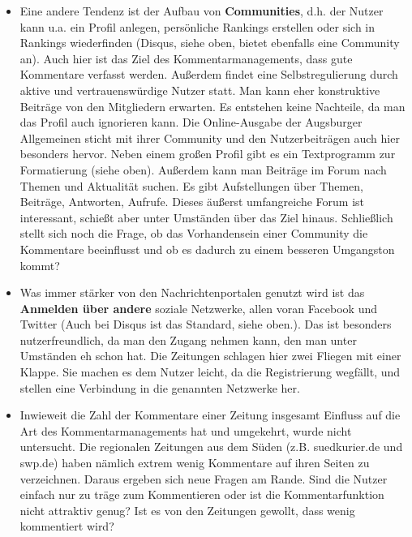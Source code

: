 \begin{itemize}
\item Eine andere Tendenz ist der Aufbau von {\bfseries Communities}, d.h. der Nutzer kann u.a. ein Profil anlegen, persönliche Rankings erstellen oder sich in Rankings wiederfinden (Disqus, siehe oben,  bietet ebenfalls eine Community an). Auch hier ist das Ziel des Kommentarmanagements, dass gute Kommentare verfasst werden. Außerdem findet eine Selbstregulierung durch aktive und vertrauenswürdige Nutzer statt. Man kann eher konstruktive Beiträge von den Mitgliedern erwarten. Es entstehen keine Nachteile, da man das Profil auch ignorieren kann.
Die Online-Ausgabe der Augsburger Allgemeinen sticht mit ihrer Community und den Nutzerbeiträgen auch hier besonders hervor. Neben einem großen Profil gibt es ein Textprogramm zur Formatierung (siehe oben). Außerdem kann man Beiträge im Forum nach Themen und Aktualität suchen. Es gibt Aufstellungen über Themen, Beiträge, Antworten, Aufrufe. Dieses äußerst umfangreiche Forum ist interessant, schießt aber unter Umständen über das Ziel hinaus. 
Schließlich stellt sich noch die Frage, ob das Vorhandensein einer Community die Kommentare beeinflusst und ob es dadurch zu einem besseren Umgangston kommt?\\

\item Was immer stärker von den Nachrichtenportalen genutzt wird ist das
{\bfseries Anmelden über andere} soziale Netzwerke, allen voran Facebook und Twitter (Auch bei Disqus ist das Standard, siehe oben.). Das ist besonders nutzerfreundlich, da man den Zugang nehmen kann, den man unter Umständen eh schon hat. Die Zeitungen schlagen hier zwei Fliegen mit einer Klappe. Sie machen es dem Nutzer leicht, da die Registrierung wegfällt, und stellen eine Verbindung in die genannten Netzwerke her. 

\item Inwieweit die Zahl der Kommentare einer Zeitung insgesamt Einfluss auf die Art des Kommentarmanagements hat und umgekehrt, wurde nicht
untersucht. Die regionalen Zeitungen aus dem Süden (z.B. suedkurier.de und swp.de) haben nämlich extrem wenig Kommentare auf ihren Seiten zu verzeichnen. 
Daraus ergeben sich neue Fragen am Rande. Sind die Nutzer einfach nur zu träge zum Kommentieren oder
ist die Kommentarfunktion nicht attraktiv genug? Ist es von den Zeitungen gewollt, dass wenig kommentiert wird? 

\end{itemize}




